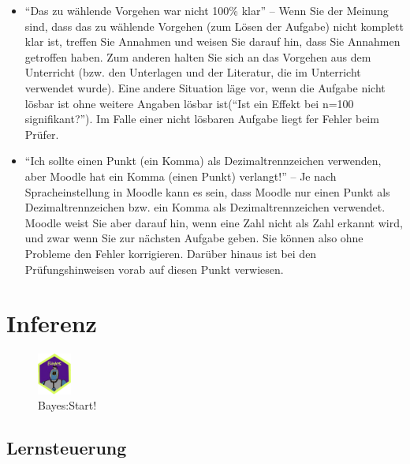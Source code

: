 \documentclass[
  a4paper,
  DIV=11]{scrreprt}
\theoremstyle{definition}
\theoremstyle{remark}
\begin{document}
\begin{itemize}
\item
  ``Das zu wählende Vorgehen war nicht 100\% klar'' -- Wenn Sie der
  Meinung sind, dass das zu wählende Vorgehen (zum Lösen der Aufgabe)
  nicht komplett klar ist, treffen Sie Annahmen und weisen Sie darauf
  hin, dass Sie Annahmen getroffen haben. Zum anderen halten Sie sich an
  das Vorgehen aus dem Unterricht (bzw. den Unterlagen und der
  Literatur, die im Unterricht verwendet wurde). Eine andere Situation
  läge vor, wenn die Aufgabe nicht lösbar ist ohne weitere Angaben
  lösbar ist(``Ist ein Effekt bei n=100 signifikant?''). Im Falle einer
  nicht lösbaren Aufgabe liegt fer Fehler beim Prüfer.
\item
  ``Ich sollte einen Punkt (ein Komma) als Dezimaltrennzeichen
  verwenden, aber Moodle hat ein Komma (einen Punkt) verlangt!'' -- Je
  nach Spracheinstellung in Moodle kann es sein, dass Moodle nur einen
  Punkt als Dezimaltrennzeichen bzw. ein Komma als Dezimaltrennzeichen
  verwendet. Moodle weist Sie aber darauf hin, wenn eine Zahl nicht als
  Zahl erkannt wird, und zwar wenn Sie zur nächsten Aufgabe geben. Sie
  können also ohne Probleme den Fehler korrigieren. Darüber hinaus ist
  bei den Prüfungshinweisen vorab auf diesen Punkt verwiesen.
\end{itemize}


\hypertarget{inferenz}{%
\chapter{Inferenz}\label{inferenz}}

\begin{figure}

{\centering \includegraphics[width=0.1\textwidth,height=\textheight]{./img/Golem_hex.png}

}

\caption{Bayes:Start!}

\end{figure}

\hypertarget{lernsteuerung}{%
\section{Lernsteuerung}\label{lernsteuerung}}
\end{document}
